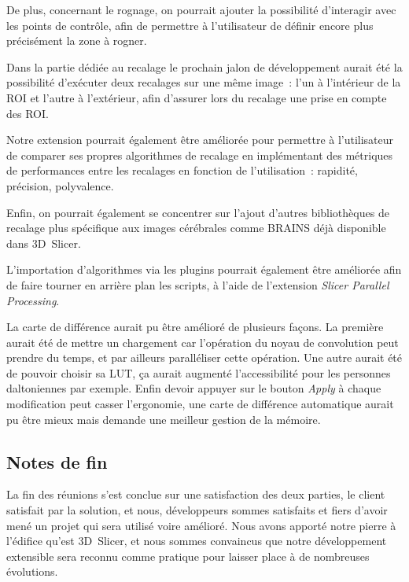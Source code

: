 \documentclass{article}
\begin{document}
{{        De plus, concernant le rognage, on pourrait ajouter la possibilité d'interagir avec les points de contrôle, afin de permettre à l'utilisateur de définir encore plus précisément la zone à rogner.

        \bigskip

        Dans la partie dédiée au recalage le prochain jalon de développement aurait été la possibilité d'exécuter deux recalages sur une même image~: l'un à l'intérieur de la ROI et l'autre à l'extérieur, afin d'assurer lors du recalage une prise en compte des ROI.

        Notre extension pourrait également être améliorée pour permettre à l'utilisateur de comparer ses propres algorithmes de recalage en implémentant des métriques de performances entre les recalages en fonction de l'utilisation~: rapidité, précision, polyvalence.

        Enfin, on pourrait également se concentrer sur l'ajout d'autres bibliothèques de recalage plus spécifique aux images cérébrales comme BRAINS déjà disponible dans 3D~Slicer.

        \bigskip

        L'importation d'algorithmes via les plugins pourrait également être améliorée afin de faire tourner en arrière plan les scripts, à l'aide de l'extension \textit{Slicer Parallel Processing}.

        \bigskip

        La carte de différence aurait pu être amélioré de plusieurs façons. La première aurait été de mettre un chargement car l'opération du noyau de convolution peut prendre du temps, et par ailleurs paralléliser cette opération. Une autre aurait été de pouvoir choisir sa LUT, ça aurait augmenté l'accessibilité pour les personnes daltoniennes par exemple. Enfin devoir appuyer sur le bouton \textit{Apply} à chaque modification peut casser l'ergonomie, une carte de différence automatique aurait pu être mieux mais demande une meilleur gestion de la mémoire.
    }

    {
        \bigskip
        \subsection{Notes de fin}

        La fin des réunions s'est conclue sur une satisfaction des deux parties, le client satisfait par la solution, et nous, développeurs sommes satisfaits et fiers d'avoir mené un projet qui sera utilisé voire amélioré. Nous avons apporté notre pierre à l'édifice qu'est 3D~Slicer, et nous sommes convaincus que notre développement extensible sera reconnu comme pratique pour laisser place à de nombreuses évolutions.
    }

    \newpage
}
\end{document}
